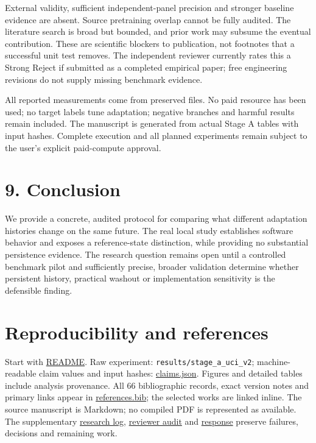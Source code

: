 \documentclass[11pt]{article}
\begin{document}
External validity, sufficient independent-panel precision and stronger baseline evidence are absent. Source pretraining overlap cannot be fully audited. The literature search is broad but bounded, and prior work may subsume the eventual contribution. These are scientific blockers to publication, not footnotes that a successful unit test removes. The independent reviewer currently rates this a Strong Reject if submitted as a completed empirical paper; free engineering revisions do not supply missing benchmark evidence.

All reported measurements come from preserved files. No paid resource has been used; no target labels tune adaptation; negative branches and harmful results remain included. The manuscript is generated from actual Stage A tables with input hashes. Complete execution and all planned experiments remain subject to the user's explicit paid-compute approval.

\section*{9. Conclusion}

We provide a concrete, audited protocol for comparing what different adaptation histories change on the same future. The real local study establishes software behavior and exposes a reference-state distinction, while providing no substantial persistence evidence. The research question remains open until a controlled benchmark pilot and sufficiently precise, broader validation determine whether persistent history, practical washout or implementation sensitivity is the defensible finding.

\section*{Reproducibility and references}

Start with \href{../README.md}{README}. Raw experiment: \texttt{results/stage\_a\_uci\_v2}; machine-readable claim values and input hashes: \href{claims.json}{claims.json}. Figures and detailed tables include analysis provenance. All 66 bibliographic records, exact version notes and primary links appear in \href{../research/references.bib}{references.bib}; the selected works are linked inline. The source manuscript is Markdown; no compiled PDF is represented as available. The supplementary \href{../research/research\_log.md}{research log}, \href{../research/reviewer\_audit.md}{reviewer audit} and \href{../research/reviewer\_response.md}{response} preserve failures, decisions and remaining work.
\end{document}
